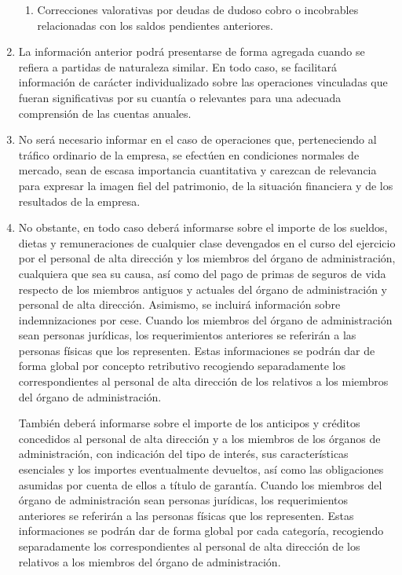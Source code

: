 \documentclass[11pt,a4paper]{article}
\begin{document}
\begin{enumerate}
\begin{enumerate}
     \item Correcciones valorativas por deudas de dudoso cobro o incobrables relacionadas con los saldos pendientes anteriores.
  \end{enumerate}

\item La información anterior podrá presentarse de forma agregada cuando se refiera a partidas de naturaleza similar. En todo caso, se facilitará información de carácter individualizado sobre las operaciones vinculadas que fueran significativas por su cuantía o relevantes para una adecuada comprensión de las cuentas anuales.

\item No será necesario informar en el caso de operaciones que, perteneciendo al tráfico ordinario de la empresa, se efectúen en condiciones normales de mercado, sean de escasa importancia cuantitativa y carezcan de relevancia para expresar la imagen fiel del patrimonio, de la situación financiera y de los resultados de la empresa.

\item No obstante, en todo caso deberá informarse sobre el importe de los sueldos, dietas y remuneraciones de cualquier clase devengados en el curso del ejercicio por el personal de alta dirección y los miembros del órgano de administración, cualquiera que sea su causa, así como del pago de primas de seguros de vida respecto de los miembros antiguos y actuales del órgano de administración y personal de alta dirección. Asimismo, se incluirá información sobre indemnizaciones por cese. Cuando los miembros del órgano de administración sean personas jurídicas, los requerimientos anteriores se referirán a las personas físicas que los representen. Estas informaciones se podrán dar de forma global por concepto retributivo recogiendo separadamente los correspondientes al personal de alta dirección de los relativos a los miembros del órgano de administración.

También deberá informarse sobre el importe de los anticipos y créditos concedidos al personal de alta dirección y a los miembros de los órganos de administración, con indicación del tipo de interés, sus características esenciales y los importes eventualmente devueltos, así como las obligaciones asumidas por cuenta de ellos a título de garantía. Cuando los miembros del órgano de administración sean personas jurídicas, los requerimientos anteriores se referirán a las personas físicas que los representen. Estas informaciones se podrán dar de forma global por cada categoría, recogiendo separadamente los correspondientes al personal de alta dirección de los relativos a los miembros del órgano de administración.


\end{enumerate}
\end{document}
